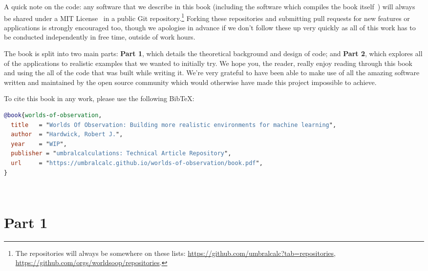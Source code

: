 \documentclass{book}
\begin{document}
A quick note on the code: any software that we describe in this book (including the software which compiles the book itself~\cite{worldsofobservationbookgithub}) will always be shared under a MIT License~\cite{mitlicense} in a public Git repository.\footnote{The repositories will always be somewhere on these lists: \href{https://github.com/umbralcalc?tab=repositories}{https://github.com/umbralcalc?tab=repositories}, \href{https://github.com/orgs/worldsoop/repositories}{https://github.com/orgs/worldsoop/repositories}.} Forking these repositories and submitting pull requests for new features or applications is strongly encouraged too, though we apologise in advance if we don't follow these up very quickly as all of this work has to be conducted independently in free time, outside of work hours.

The book is split into two main parts: {\bfseries\sffamily Part 1}, which details the theoretical background and design of code; and {\bfseries\sffamily Part 2}, which explores all of the applications to realistic examples that we wanted to initially try. We hope you, the reader, really enjoy reading through this book and using the all of the code that was built while writing it. We're very grateful to have been able to make use of all the amazing software written and maintained by the open source community which would otherwise have made this project impossible to achieve.

To cite this book in any work, please use the following BibTeX:
\begin{adjustwidth}{2em}{2em}
\begin{lstlisting}[language=BibTeX,numbers=none]
@book{worlds-of-observation,
  title   = "Worlds Of Observation: Building more realistic environments for machine learning",
  author  = "Hardwick, Robert J.",
  year    = "WIP",
  publisher = "umbralcalculations: Technical Article Repository",
  url     = "https://umbralcalc.github.io/worlds-of-observation/book.pdf",
}
\end{lstlisting}
\end{adjustwidth}

\newpage \ \newpage
{\sffamily \tableofcontents}
\mainmatter

\part*{{\sffamily Part 1}}




\end{document}
